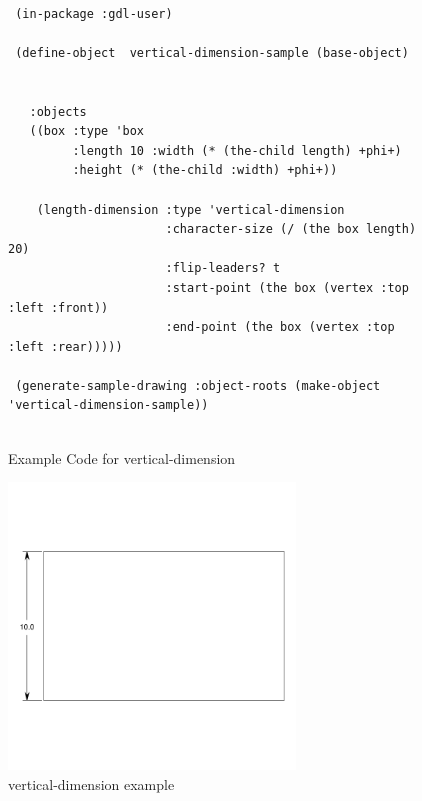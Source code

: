 \documentclass [11pt]{book}
\begin{document}
\begin{itemize}
\begin{figure}
\begin{lrbox}{\boxedverb}
\begin{minipage}{\linewidth}
{\begin{verbatim}        

 (in-package :gdl-user)
                   
 (define-object  vertical-dimension-sample (base-object)
  
  
   :objects
   ((box :type 'box
         :length 10 :width (* (the-child length) +phi+)
         :height (* (the-child :width) +phi+))
   
    (length-dimension :type 'vertical-dimension
                      :character-size (/ (the box length) 20)
                      :flip-leaders? t
                      :start-point (the box (vertex :top :left :front))
                      :end-point (the box (vertex :top :left :rear)))))

 (generate-sample-drawing :object-roots (make-object 'vertical-dimension-sample))


\end{verbatim}}
\end{minipage}
\end{lrbox}
\fbox{\usebox{\boxedverb}}

\caption{Example Code for vertical-dimension}

\label{fig:example-code-vertical-dimension}

\end{figure}

\begin{figure}
\begin{center}
\includegraphics[width=3in,height=3in]{../images/example-vertical-dimension.pdf}
\end{center}

\caption{vertical-dimension example}

\label{fig:vertical-dimension}

\end{figure}






\end{itemize}
\end{document}
